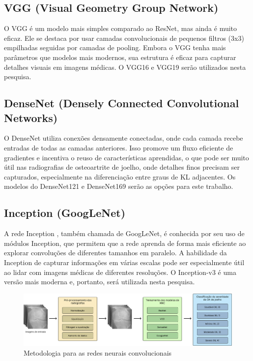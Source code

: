\subsection{VGG (Visual Geometry Group Network)}

O VGG \cite{Simonyan2015} é um modelo mais simples comparado ao ResNet, mas ainda é muito eficaz. Ele se destaca por usar camadas convolucionais de pequenos filtros (3x3) empilhadas seguidas por camadas de pooling. Embora o VGG tenha mais parâmetros que modelos mais modernos, sua estrutura é eficaz para capturar detalhes visuais em imagens médicas. O VGG16 e VGG19 serão utilizados nesta pesquisa.

\subsection{DenseNet (Densely Connected Convolutional Networks)}

O DenseNet \cite{Huang2017} utiliza conexões densamente conectadas, onde cada camada recebe entradas de todas as camadas anteriores. Isso promove um fluxo eficiente de gradientes e incentiva o reuso de características aprendidas, o que pode ser muito útil nas radiografias de osteoartrite de joelho, onde detalhes finos precisam ser capturados, especialmente na diferenciação entre graus de KL adjacentes. Os modelos do DenseNet121 e DenseNet169 serão as opções para este trabalho.

\subsection{Inception (GoogLeNet)}

A rede Inception \cite{Szegedy2016}, também chamada de GoogLeNet, é conhecida por seu uso de módulos Inception, que permitem que a rede aprenda de forma mais eficiente ao explorar convoluções de diferentes tamanhos em paralelo. A habilidade da Inception de capturar informações em várias escalas pode ser especialmente útil ao lidar com imagens médicas de diferentes resoluções. O Inception-v3 é uma versão mais moderna e, portanto, será utilizada nesta pesquisa.

\begin{figure}[h]
    \centering
    \includegraphics[width=\linewidth]{figs/modelo-rnc.png}
    \caption{Metodologia para as redes neurais convolucionais}
    \label{modelo rnc}
\end{figure}

